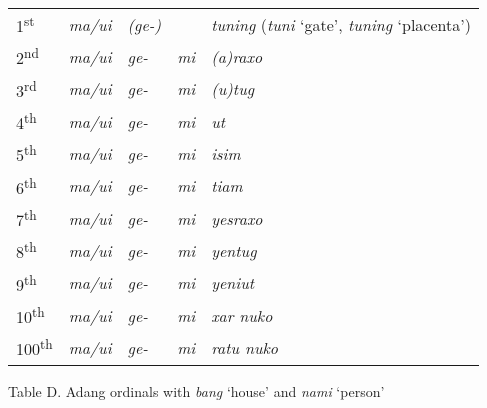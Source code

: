 \begin{flushleft}
\tablehead{}
\begin{supertabular}{m{0.6205598in}m{0.5462598in}m{0.42125985in}m{0.6705598in}m{3.0337598in}}
1\textsuperscript{st} &
\textit{ma/ui} &
\textit{(ge-)} &
 &
\textit{tuning  }(\textit{tuni }{\textquoteleft}gate{\textquoteright}, \textit{tuning }{\textquoteleft}placenta{\textquoteright})\\
2\textsuperscript{nd} &
\textit{ma/ui} &
\textit{ge-} &
\textit{mi} &
\textit{(a)raxo}\\
3\textsuperscript{rd} &
\textit{ma/ui} &
\textit{ge-} &
\textit{mi} &
\textit{(u)tug}\\
4\textsuperscript{th} &
\textit{ma/ui} &
\textit{ge-} &
\textit{mi} &
\textit{ut}\\
5\textsuperscript{th} &
\textit{ma/ui} &
\textit{ge-} &
\textit{mi} &
\textit{isim}\\
6\textsuperscript{th} &
\textit{ma/ui} &
\textit{ge-} &
\textit{mi} &
\textit{tiam}\\
7\textsuperscript{th} &
\textit{ma/ui} &
\textit{ge-} &
\textit{mi} &
\textit{yesraxo }\\
8\textsuperscript{th} &
\textit{ma/ui} &
\textit{ge-  } &
\textit{mi} &
\textit{yentug}\\
9\textsuperscript{th} &
\textit{ma/ui} &
\textit{ge-} &
\textit{mi} &
\textit{yeniut}\\
10\textsuperscript{th} &
\textit{ma/ui} &
\textit{ge-} &
\textit{mi} &
\textit{xar nuko}\\
100\textsuperscript{th} &
\textit{ma/ui} &
\textit{ge-} &
\textit{mi} &
\textit{ratu nuko}\\
\end{supertabular}
\end{flushleft}
Table D. Adang ordinals with \textit{bang }{\textquoteleft}house{\textquoteright} and \textit{nami }{\textquoteleft}person{\textquoteright}

